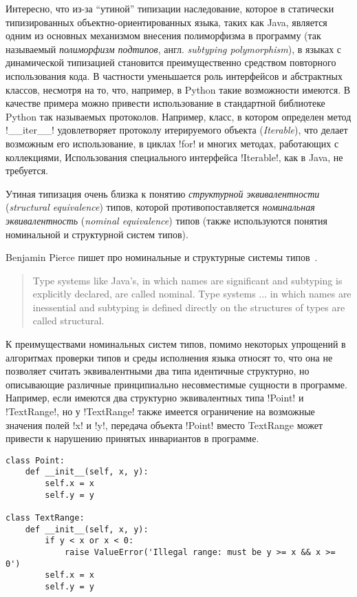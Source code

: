 Интересно, что из-за ``утиной'' типизации наследование, которое в статически
типизированных объектно-ориентированных языка, таких как Java, является
одним из основных механизмом внесения полиморфизма в программу (так называемый
\emph{полиморфизм подтипов}, англ. \emph{subtyping polymorphism}),
в языках с динамической типизацией становится преимущественно средством
повторного использования кода. В частности уменьшается роль интерфейсов и
абстрактных классов, несмотря на то, что, например, в Python такие возможности
имеются. В качестве примера можно привести использование в
стандартной библиотеке Python так называемых протоколов. Например, класс, в
котором определен метод !__iter__! удовлетворяет протоколу
итерируемого объекта (\emph{Iterable}), что делает возможным его использование,
в циклах !for! и многих методах, работающих с коллекциями, 
Использования специального интерфейса !Iterable!, как в Java, не требуется.

Утиная типизация очень близка к понятию \emph{структурной эквивалентности}
(\emph{structural equivalence}) типов, которой противопоставляется \emph{номинальная
эквивалентность} (\emph{nominal equivalence}) типов (также используются понятия
номинальной и структурной систем типов).

Benjamin Pierce пишет про номинальные и структурные системы типов~\cite{Pierce2002}.

\begin{quote}
Type systems like Java’s, in which names are significant and subtyping is
explicitly declared, are called nominal. Type systems ... in which names are
inessential and subtyping is defined directly on the structures of types are
called structural.
\end{quote}

К преимуществами номинальных систем типов, помимо некоторых упрощений в
алгоритмах проверки типов и среды исполнения языка относят то,
что она не позволяет считать эквивалентными два типа идентичные структурно, но
описывающие различные принципиально несовместимые сущности в программе.
Например, если имеются два структурно эквивалентных типа !Point! и
!TextRange!, но у !TextRange! также имеется ограничение на
возможные значения полей !x! и !y!, передача объекта !Point! вместо
TextRange может привести к нарушению принятых инвариантов в программе.

\begin{lstlisting}
class Point:
    def __init__(self, x, y):
        self.x = x
        self.y = y

class TextRange:
    def __init__(self, x, y):
        if y < x or x < 0:
            raise ValueError('Illegal range: must be y >= x && x >= 0')
        self.x = x
        self.y = y
\end{lstlisting}


